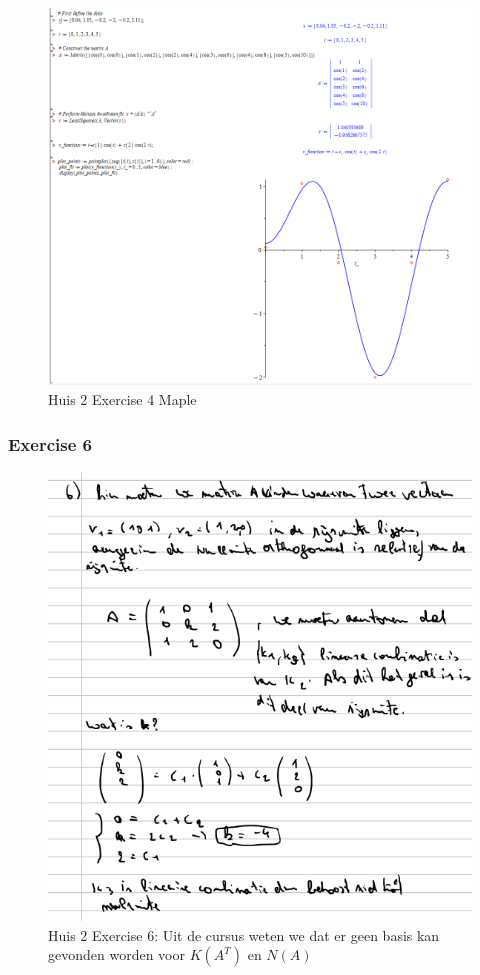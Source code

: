 \documentclass[a4paper]{report}
\begin{document}
\begin{figure}[H]
	\centering
	\includegraphics[width=\textwidth]{images/huis_2_maple_4.png}
	\caption{Huis 2 Exercise 4 Maple}
	\label{fig:huis_2_ex_4_maple}
\end{figure}

\subsubsection{Exercise 6}

\begin{figure}[H]
	\centering
	\includegraphics[width=\textwidth]{images/huis_2_6.png}
	\caption{Huis 2 Exercise 6: Uit de cursus weten we dat er geen basis kan gevonden worden voor $K(A^T)$ en $N(A)$}
	\label{fig:huis_2_ex_6}
\end{figure}
\end{document}

